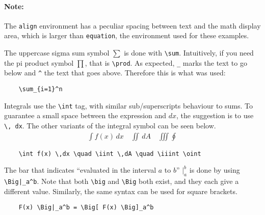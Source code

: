 \paragraph{Note:}
The \verb|align| environment has a peculiar spacing between text and the math display area, which is larger than \verb|equation|, the environment used for these examples.

The uppercase sigma sum symbol \( \sum \) is done with \verb|\sum|.
Intuitively, if you need the pi product symbol \( \prod \), that is \verb|\prod|.
As expected, \verb|_| marks the text to go below and \verb|^| the text that goes above.
Therefore this is what was used: 
\begin{lstlisting}
    \sum_{i=1}^n
\end{lstlisting} 

Integrals use the \verb|\int| tag, with similar sub/superscripts behaviour to sums.
To guarantee a small space between the expression and \( dx \), the suggestion is to use \verb|\, dx|.
The other variants of the integral symbol can be seen below.
\begin{align*}
    \int f(x) \,dx \quad \iint \,dA \quad \iiint \oint 
\end{align*}
\begin{lstlisting}
    \int f(x) \,dx \quad \iint \,dA \quad \iiint \oint 
\end{lstlisting}

The bar that indicates ``evaluated in the interval \( a \) to \( b \)'' \( \Big|_a^b \) is done by using \verb!\Big|_a^b!.
Note that both \verb|\big| and \verb|\Big| both exist, and they each give a different value. 
Similarly, the same syntax can be used for square brackets.
\begin{lstlisting}
    F(x) \Big|_a^b = \Big[ F(x) \Big]_a^b
\end{lstlisting}